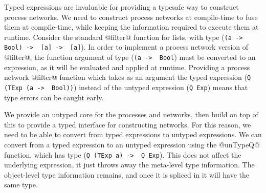 Typed expressions are invaluable for providing a typesafe way to construct process networks.
We need to construct process networks at compile-time to fuse them at compile-time, while keeping the information required to execute them at runtime.
Consider the standard @filter@ function for lists, with type (\lstinline/(a ->  Bool) ->  [a] ->  [a]/).
In order to implement a process network version of @filter@, the function argument of type (\lstinline/(a ->  Bool/) must be converted to an expression, as it will be evaluated and applied at runtime.
Providing a process network @filter@ function which takes as an argument the typed expression (\lstinline/Q (TExp (a ->  Bool))/) instead of the untyped expression (\lstinline/Q Exp/) means that type errors can be caught early.

We provide an untyped core for the processes and networks, then build on top of this to provide a typed interface for constructing networks.
For this reason, we need to be able to convert from typed expressions to untyped expressions.
We can convert from a typed expression to an untyped expression using the @unTypeQ@ function, which has type (\lstinline/Q (TExp a) ->  Q Exp/).
This does not affect the underlying expression, it just throws away the meta-level type information.
The object-level type information remains, and once it is spliced in it will have the same type.

 



